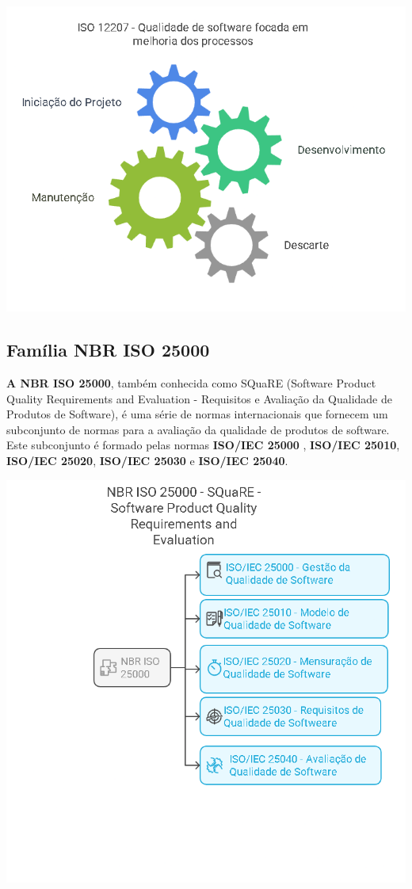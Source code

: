 \documentclass[
]{book}
\begin{document}
\includegraphics{images/qualidade-geral/ISO-12207-processos.png}

\subsection{Família NBR ISO 25000}\label{famuxedlia-nbr-iso-25000}

\textbf{A NBR ISO 25000}, também conhecida como SQuaRE (Software Product Quality Requirements and Evaluation - Requisitos e Avaliação da Qualidade de Produtos de Software), é uma série de normas internacionais que fornecem um subconjunto de normas para a avaliação da qualidade de produtos de software. Este subconjunto é formado pelas normas \textbf{ISO/IEC 25000} , \textbf{ISO/IEC 25010}, \textbf{ISO/IEC 25020}, \textbf{ISO/IEC 25030} e \textbf{ISO/IEC 25040}.

\includegraphics{images/qualidade-geral/ISO-25000-SQuaRE.png}
\end{document}
